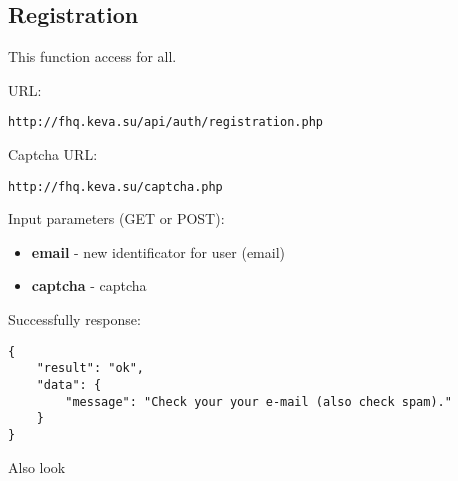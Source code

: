 \subsection{Registration}
\par

This function access for all.

URL:
\begin{Verbatim}[frame=single]
http://fhq.keva.su/api/auth/registration.php
\end{Verbatim}

Captcha URL:
\begin{Verbatim}[frame=single]
http://fhq.keva.su/captcha.php
\end{Verbatim}

Input parameters (GET or POST):
\begin{itemize}
  \item \textbf{email} - new identificator for user (email)
  \item \textbf{captcha} - captcha
\end{itemize}

Successfully response:  \\
\begin{Verbatim}[frame=single]
{
    "result": "ok",
    "data": {
        "message": "Check your your e-mail (also check spam)."
    }
}
\end{Verbatim}

Also look ~
